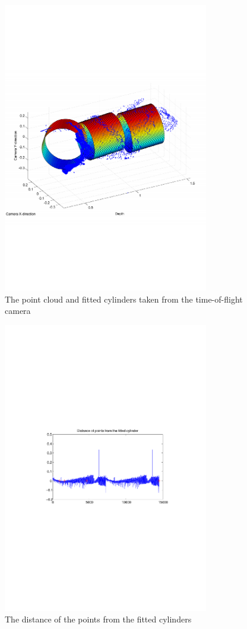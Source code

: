 \begin{figure}[htbp]
    \centering
    \includegraphics[width=0.8\textwidth]{pics/longpipe-tof-3d}
    \caption{The point cloud and fitted cylinders taken from the time-of-flight camera}
    \label{chap7:fig-longpipe-tof-3d}
\end{figure}
\begin{figure}[htbp]
    \centering
    \includegraphics[width=0.8\textwidth]{pics/longpipe-tof-dist}
    \caption{The distance of the points from the fitted cylinders}
    \label{chap7:fig-longpipe-tof-dits}
\end{figure}
